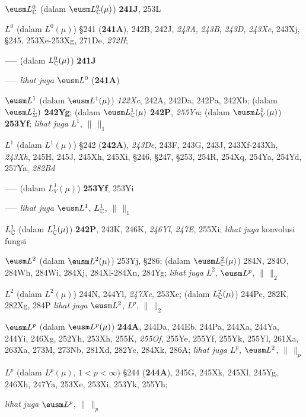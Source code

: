 $\eusm L^0_{\Bbb C}$ (dalam $\eusm L^0_{\Bbb C}(\mu)$) {\bf 241J}, 253L


$L^0$ (dalam $L^0(\mu)$) \S241 ({\bf 241A}), 242B, 242J, {\it 243A},
{\it 243B}, {\it 243D}, {\it 243Xe}, 243Xj,
\S245, 253Xe-253Xg, 
271De, {\it 272H}; 


----- (dalam $L^0_{\Bbb C}(\mu)$) {\bf 241J}






----- {\it lihat juga} $\eusm L^0$ ({\bf 241A})


$\eusm L^1$ (dalam $\eusm L^1(\mu)$) {\it 122Xc}, 242A, 242Da, 242Pa,
242Xb; 
  (dalam $\eusm L^1_{\Sigma})$ {\bf 242Yg};
  (dalam $\eusm L^1_{\Bbb C}(\mu)$ {\bf 242P}, {\it 255Yn};
  (dalam $\eusm L^1_V(\mu)$) {\bf 253Yf};
  {\it lihat juga} $L^1$, $\|\,\|_1$
  

$L^1$ (dalam $L^1(\mu)$) \S242 ({\bf 242A}),
{\it 243De}, 243F, 243G, 243J, 243Xf-243Xh, 
{\it 243Xh},
245H, 245J, 245Xh, 245Xi, \S246,
\S247, \S253, 254R, 254Xq, 254Ya, 254Yd, 257Ya, {\it 282Bd} 


----- (dalam $L^1_V(\mu)$) {\bf 253Yf}, 253Yi




----- {\it lihat juga} $\eusm L^1$, $L^1_{\Bbb C}$, $\|\,\|_1$


$L^1_{\Bbb C}$ (dalam $L^1_{\Bbb C}(\mu)$) {\bf 242P}, 243K,
246K, {\it 246Yl}, {\it 247E}, 255Xi;
  {\it lihat juga} konvolusi fungsi


$\eusm L^2$ (dalam $\eusm L^2(\mu)$) 253Yj, \S286;  
  (dalam $\eusm L^2_{\Bbb C}(\mu)$) 284N, 284O, 284Wh, 284Wi, 284Xj,
284Xl-284Xn, 
284Yg;
  {\it lihat juga} $L^2$, $\eusm L^p$, $\|\,\|_2$


$L^2$ (dalam $L^2(\mu)$) 244N, 244Yl, {\it 247Xe}, 253Xe; 
  (dalam $L^2_{\Bbb C}(\mu)$) 244Pe, 282K, 282Xg, 284P
  {\it lihat juga} $\eusm L^2$, $L^p$, $\|\,\|_2$



$\eusm L^p$ (dalam $\eusm L^p(\mu)$) {\bf 244A}, 244Da, 244Eb, 244Pa,
244Xa, 244Ya, 244Yi,
246Xg, 252Yh, 253Xh, 255K, {\it 255Of}, 255Ye, 255Yf, 255Yk, 255Yl,
261Xa, 263Xa, 273M, 273Nb, 281Xd, 282Yc, 284Xk, 286A; 
  {\it lihat juga} $L^p$, $\eusm L^2$, $\|\,\|_p$


$L^p$ (dalam $L^p(\mu)$, $1<p<\infty$) \S244 ({\bf 244A}), 245G, 245Xk,
245Xl, 245Yg, 246Xh, 247Ya, 253Xe, 253Xi, 253Yk, 255Yh; 
  
  
  
  {\it lihat juga} $\eusm L^p$, $\|\,\|_p$


